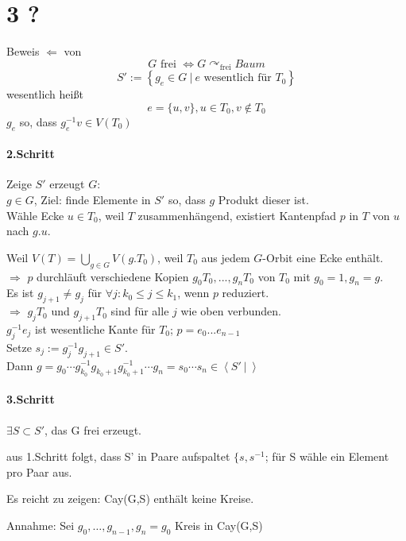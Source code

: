 \documentclass{article}
\newcommand{\set}[2]{\left\lbrace #1~|~#2 \right\rbrace}
\newcommand{\grp}[2]{\left\langle #1~|~#2 \right\rangle}
\begin{document}
\section{3 ?}


Beweis $\Longleftarrow$ von 
\[G \text{ frei } \Longleftrightarrow G \curvearrowright_\text{frei} Baum \]
\[S' := \set{g_e \in G}{e \text{ wesentlich für }T_0} \]
wesentlich heißt
\[e = \{u,v\}, u \in T_0, v \notin T_0\]
$g_e$ so, dass $g_e^{-1} v \in V(T_0)$

\paragraph{2.Schritt}
Zeige $S'$ erzeugt $G$:\\

$g\in G$, Ziel: finde Elemente in $S'$ so, dass $g$ Produkt dieser ist.\\

Wähle Ecke $u \in T_0$, weil $T$ zusammenhängend, existiert Kantenpfad $p$ in $T$ von $u$ nach $g.u$.

Weil $V(T) = \bigcup_{g\in G} V(g.T_0)$, weil $T_0$ aus jedem $G$-Orbit eine Ecke enthält.\\
$\Longrightarrow$ $p$ durchläuft verschiedene Kopien $g_0T_0, ..., g_nT_0$ von $T_0$ mit $g_0 = 1, g_n = g$.\\
Es ist $g_{j+1} \neq g_j$ für $\forall j: k_0 \leq j \leq k_1$, wenn $p$ reduziert.\\
$\Rightarrow$ $g_jT_0$ und $g_{j+1}T_0$ sind für alle $j$ wie oben verbunden.\\
$g_j^{-1} e_j$ ist wesentliche Kante für $T_0$; $p = e_0...e_{n-1}$\\
Setze $s_j := g_j^{-1}g_{j+1} \in S'$.\\
Dann $g = g_0 \cdots g_{k_0}^{-1}g_{k_0 +1} g_{k_0 +1}^{-1} \cdots g_n = s_0 \cdots s_n \in \grp{S'}{}$

\paragraph{3.Schritt}
$\exists S \subset S'$, das G frei erzeugt.

aus 1.Schritt folgt, dass S' in Paare aufspaltet $\{s, s^{-1}$; für S wähle ein Element pro Paar aus.

Es reicht zu zeigen: Cay(G,S) enthält keine Kreise.

Annahme: Sei $g_0,\ldots, g_{n-1}, g_n = g_0$ Kreis in Cay(G,S)
\end{document}

